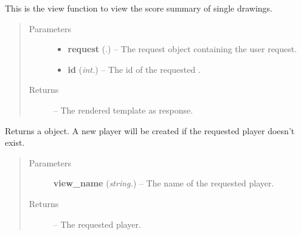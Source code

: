 \documentclass[letterpaper,10pt,english]{sphinxmanual}
\begin{document}

\begin{fulllineitems}
\label{Contour.contour:Contour.contour.views.drawing}
This is the view function to view the score summary of single drawings.
\begin{quote}\begin{description}
\item[{Parameters}] \leavevmode\begin{itemize}
\item {} 
\textbf{request} (.) -- The request object containing the user request.

\item {} 
\textbf{id} (\emph{int.}) -- The id of the requested {\hyperref[Contour.contour:Contour.contour.models.Drawing]{}}.

\end{itemize}

\item[{Returns}] \leavevmode
{} -- The rendered template as response.

\end{description}\end{quote}

\end{fulllineitems}


\begin{fulllineitems}
\label{Contour.contour:Contour.contour.views.get_player}
Returns a {\hyperref[Contour.contour:Contour.contour.models.Player]{}} object. A new player will be created if the requested player doesn't exist.
\begin{quote}\begin{description}
\item[{Parameters}] \leavevmode
\textbf{view\_name} (\emph{string.}) -- The name of the requested player.

\item[{Returns}] \leavevmode
{} -- The requested player.

\end{description}\end{quote}

\end{fulllineitems}
\end{document}
